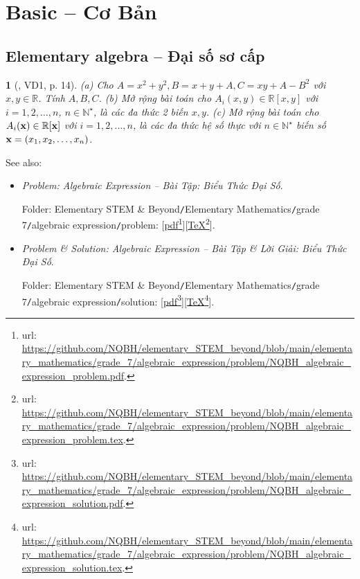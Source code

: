 \documentclass{article}
\newtheorem{baitoan}{}
\begin{document}
\section{Basic -- Cơ Bản}

\subsection{Elementary algebra -- Đại số sơ cấp}

\begin{baitoan}[\cite{Doanh_Tuan_Pascal}, VD1, p. 14]
	(a) Cho $A = x^2 + y^2,B = x + y + A,C = xy + A - B^2$ với $x,y\in\mathbb{R}$. Tính $A,B,C$. (b) Mở rộng bài toán cho $A_i(x,y)\in\mathbb{R}[x,y]$ với $i = 1,2,\ldots,n$, $n\in\mathbb{N}^\star$, là các đa thức 2 biến $x,y$. (c) Mở rộng bài toán cho $A_i({\bf x})\in\mathbb{R}[{\bf x}]$ với $i = 1,2,\ldots,n$, là các đa thức  hệ số thực với $n\in\mathbb{N}^\star$ biến số ${\bf x} = (x_1,x_2,\ldots,x_n)$.
\end{baitoan}
See also:
\begin{itemize}
	\item {\it Problem: Algebraic Expression -- Bài Tập: Biểu Thức Đại Số}.
	
	Folder: {\sf Elementary STEM \& Beyond{\tt/}Elementary Mathematics{\tt/}grade 7{\tt/}algebraic expression{\tt/}problem}: [\href{https://github.com/NQBH/elementary_STEM_beyond/blob/main/elementary_mathematics/grade_7/algebraic_expression/problem/NQBH_algebraic_expression_problem.pdf}{pdf}\footnote{{\sc url}: \url{https://github.com/NQBH/elementary_STEM_beyond/blob/main/elementary_mathematics/grade_7/algebraic_expression/problem/NQBH_algebraic_expression_problem.pdf}.}][\href{https://github.com/NQBH/elementary_STEM_beyond/blob/main/elementary_mathematics/grade_7/algebraic_expression/problem/NQBH_algebraic_expression_problem.tex}{\TeX}\footnote{{\sc url}: \url{https://github.com/NQBH/elementary_STEM_beyond/blob/main/elementary_mathematics/grade_7/algebraic_expression/problem/NQBH_algebraic_expression_problem.tex}.}].
	\item {\it Problem \& Solution: Algebraic Expression -- Bài Tập \& Lời Giải: Biểu Thức Đại Số}.
	
	Folder: {\sf Elementary STEM \& Beyond{\tt/}Elementary Mathematics{\tt/}grade 7{\tt/}algebraic expression{\tt/}solution}: [\href{https://github.com/NQBH/elementary_STEM_beyond/blob/main/elementary_mathematics/grade_7/algebraic_expression/problem/NQBH_algebraic_expression_solution.pdf}{pdf}\footnote{{\sc url}: \url{https://github.com/NQBH/elementary_STEM_beyond/blob/main/elementary_mathematics/grade_7/algebraic_expression/problem/NQBH_algebraic_expression_solution.pdf}.}][\href{https://github.com/NQBH/elementary_STEM_beyond/blob/main/elementary_mathematics/grade_7/algebraic_expression/problem/NQBH_algebraic_expression_solution.tex}{\TeX}\footnote{{\sc url}: \url{https://github.com/NQBH/elementary_STEM_beyond/blob/main/elementary_mathematics/grade_7/algebraic_expression/problem/NQBH_algebraic_expression_solution.tex}.}].
\end{itemize}
\end{document}
